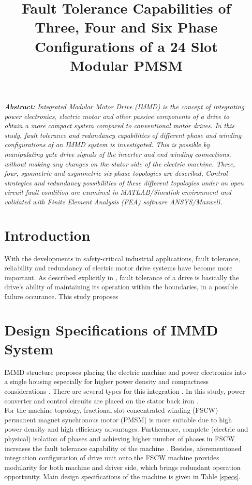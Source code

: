\documentclass[a4paper,11pt]{article}
\title{\normalsize\textbf{Fault Tolerance Capabilities of Three, Four and Six Phase Configurations of a 24 Slot Modular PMSM}}
\date{}
\begin{document}
\vspace{-45mm}
\maketitle
\vspace{-23mm}

\textit{\normalsize\textbf{Abstract:}}
\textit{Integrated Modular Motor Drive (IMMD) is the concept of integrating power electronics, electric motor and other passive components of a drive to obtain a more compact system compared to conventional motor drives. In this study, fault tolerance and redundancy capabilities of different phase and winding configurations of an IMMD system is investigated. This is possible by manipulating gate drive signals of the inverter and end winding connections, without making any changes on the stator side of the electric machine. Three, four, symmetric and asymmetric six-phase topologies are described. Control strategies and redundancy possibilities of these different topologies under an open circuit fault condition are examined in MATLAB/Simulink environment and validated with Finite Element Analysis (FEA) software ANSYS/Maxwell. }

\section{\normalsize\textbf{Introduction}}
With the developments in safety-critical industrial applications, fault tolerance, reliability and redundancy of electric motor drive systems have become more important. As described explicitly in \cite{bible}, fault tolerance of a drive is basically the drive's ability of maintaining its operation within the boundaries, in a possible failure occurance. This study proposes 

\section{\normalsize\textbf{Design Specifications of IMMD System}}
IMMD structure proposes placing the electric machine and power electronics into a single housing especially for higher power density and compactness considerations \cite{immd-bible}. There are several types for this integration \cite{difftopology1}\cite{difftopology2}. In this study, power converter and control circuits are placed on the stator back iron \cite{mesutto}. \\
For the machine topology, fractional slot concentrated winding (FSCW) permanent magnet synchronous motor (PMSM) is more suitable due to high power density and high efficiency advantages. Furthermore, complete (electric and physical) isolation of phases and achieving higher number of phases in FSCW increases the fault tolerance capability of the machine \cite{fscw}. Besides, aforementioned integration configuration of drive unit onto the FSCW machine provides modularity for both machine and driver side, which brings redundant operation opportunity. Main design specifications of the machine is given in Table \ref{specs}.
\end{document}
